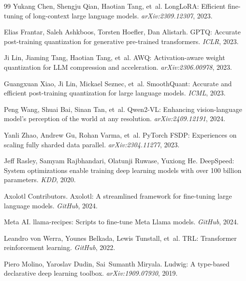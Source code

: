 \begin{thebibliography}{99}
Yukang Chen, Shengju Qian, Haotian Tang, et~al.
\newblock LongLoRA: Efficient fine-tuning of long-context large language models.
\newblock \emph{arXiv:2309.12307}, 2023.

Elias Frantar, Saleh Ashkboos, Torsten Hoefler, Dan Alistarh.
\newblock GPTQ: Accurate post-training quantization for generative pre-trained transformers.
\newblock \emph{ICLR}, 2023.

Ji Lin, Jiaming Tang, Haotian Tang, et~al.
\newblock AWQ: Activation-aware weight quantization for LLM compression and acceleration.
\newblock \emph{arXiv:2306.00978}, 2023.

Guangxuan Xiao, Ji Lin, Mickael Seznec, et~al.
\newblock SmoothQuant: Accurate and efficient post-training quantization for large language models.
\newblock \emph{ICML}, 2023.

Peng Wang, Shuai Bai, Sinan Tan, et~al.
\newblock Qwen2-VL: Enhancing vision-language model's perception of the world at any resolution.
\newblock \emph{arXiv:2409.12191}, 2024.

Yanli Zhao, Andrew Gu, Rohan Varma, et~al.
\newblock PyTorch FSDP: Experiences on scaling fully sharded data parallel.
\newblock \emph{arXiv:2304.11277}, 2023.

Jeff Rasley, Samyam Rajbhandari, Olatunji Ruwase, Yuxiong He.
\newblock DeepSpeed: System optimizations enable training deep learning models with over 100 billion parameters.
\newblock \emph{KDD}, 2020.

Axolotl Contributors.
\newblock Axolotl: A streamlined framework for fine-tuning large language models.
\newblock \emph{GitHub}, 2024.

Meta AI.
\newblock llama-recipes: Scripts to fine-tune Meta Llama models.
\newblock \emph{GitHub}, 2024.

Leandro von Werra, Younes Belkada, Lewis Tunstall, et~al.
\newblock TRL: Transformer reinforcement learning.
\newblock \emph{GitHub}, 2022.

Piero Molino, Yaroslav Dudin, Sai~Sumanth Miryala.
\newblock Ludwig: A type-based declarative deep learning toolbox.
\newblock \emph{arXiv:1909.07930}, 2019.


\end{thebibliography}
